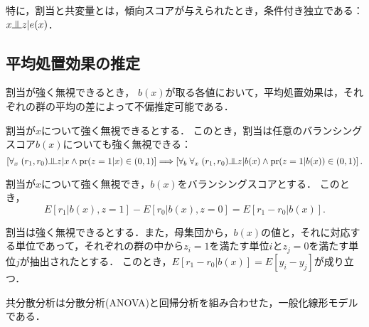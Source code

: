 \documentclass[uplatex,dvipdfmx]{jsreport}
\begin{document}
\begin{corollary}
    特に，割当と共変量とは，傾向スコアが与えられたとき，条件付き独立である：
    $x\indep z|e(x)$．
\end{corollary}

\subsection{平均処置効果の推定}

\begin{tcolorbox}[colframe=ForestGreen, colback=ForestGreen!10!white,breakable,colbacktitle=ForestGreen!40!white,coltitle=black,fonttitle=\bfseries\sffamily,
title=]
    割当が強く無視できるとき，
    $b(x)$が取る各値において，平均処置効果は，それぞれの群の平均の差によって不偏推定可能である．
\end{tcolorbox}

\begin{theorem}
    割当が$x$について強く無視できるとする．
    このとき，割当は任意のバランシングスコア$b(x)$についても強く無視できる：
    \[\Square{\forall_{x}\;(r_1,r_0)\indep z|x\land\pr(z=1|x)\in(0,1)}\Longrightarrow\Square{\forall_{b}\;\forall_{x}\;(r_1,r_0)\indep z|b(x)\land\pr(z=1|b(x))\in (0,1)}.\]
\end{theorem}

\begin{theorem}
    割当が$x$について強く無視でき，$b(x)$をバランシングスコアとする．
    このとき，
    \[E[r_1|b(x),z=1]-E[r_0|b(x),z=0]=E[r_1-r_0|b(x)].\]
\end{theorem}

\begin{corollary}
    割当は強く無視できるとする．また，母集団から，$b(x)$の値と，それに対応する単位であって，それぞれの群の中から$z_i=1$を満たす単位$i$と$z_j=0$を満たす単位$j$が抽出されたとする．
    このとき，$E[r_1-r_0|b(x)]=E[y_i-y_j]$が成り立つ．
\end{corollary}

\begin{corollary}
    
\end{corollary}

\begin{corollary}
    
\end{corollary}
\begin{remark}
    共分散分析は分散分析(ANOVA)と回帰分析を組み合わせた，一般化線形モデルである．
\end{remark}
\end{document}
